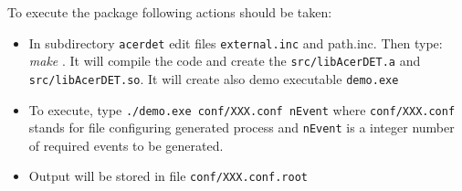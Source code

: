 To execute the package following actions should be taken:
\begin{itemize}
\item
In subdirectory {\tt acerdet} edit files {\tt  external.inc} and {path.inc}.
Then type: {\it make }. It will
compile the code and create the {\tt src/libAcerDET.a} and {\tt src/libAcerDET.so}.
It will create also demo executable {\tt demo.exe}
\item
To execute, type  {\tt ./demo.exe  conf/XXX.conf nEvent}
where  {\tt conf/XXX.conf} stands for file configuring generated process and 
{\tt nEvent} is a integer number of required events to be generated.
\item
Output will be stored in file  {\tt conf/XXX.conf.root}

\end{itemize}



\newpage
